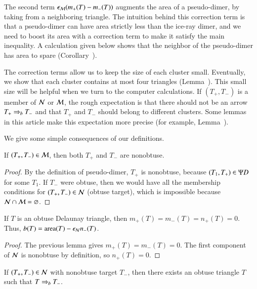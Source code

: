 The second term $\epsilon_{\mathcal M} (m_+(T) - m_-(T))$ augments the area
of a pseudo-dimer, by taking from a neighboring triangle.  The intuition behind
this correction term is that a pseudo-dimer can have area strictly
less than the ice-ray dimer, and we need to boost its area with a
correction term to make it satisfy the main inequality.  A calculation
given below shows that the neighbor of the pseudo-dimer has area to
spare (Corollary~). 

The correction terms allow us to keep the size of each cluster small.
Eventually, we show that each cluster contains at most four triangles
(Lemma~).  This small size will be helpful when we
turn to the computer calculations.  If $(T_+,T_-)$ is a member of $\mathcal N$
or $\mathcal M$, the rough expectation is that there should not be an arrow
$T_+\Rightarrow_{b} T_-$ and that $T_+$ and $T_-$ should belong to different
clusters.  Some lemmas in this article make this expectation more
precise (for example, Lemma~).

We give some simple consequences of our definitions.

\begin{lemma} 
  If $(T_+,T_-)\in \mathcal M$, then both $T_+$ and $T_-$ are nonobtuse.
\end{lemma}

\begin{proof} 
  By the definition of pseudo-dimer, $T_+$ is nonobtuse, because
  $(T_1,T_+)\in\Psi D$ for some $T_1$.  If $T_-$ were obtuse, then we
  would have all the membership conditions for $(T_+,T_-)\in \mathcal N$
  (obtuse target), which is impossible because $\mathcal N\cap \mathcal M =
  \varnothing$.
\end{proof}

\begin{lemma}[obtuse $b$] 
  If $T$ is an obtuse Delaunay triangle, then
  $m_+(T)=m_-(T)=n_+(T)=0$.  Thus, $b(T) = {\operatorname{area}}(T) - \epsilon_{\mathcal N} n_-(T)$.
\end{lemma}

\begin{proof} 
  The previous lemma gives $m_+(T)=m_-(T)=0$.  The first component of
  $\mathcal N$ is nonobtuse by definition, so $n_+(T)=0$.
\end{proof}

\begin{corollary} 
  If $(T_+,T_-)\in\mathcal N$ with nonobtuse target $T_-$, then there exists
  an obtuse triangle $T$ such that $T\Rightarrow_{b} T_-$.
\end{corollary}

